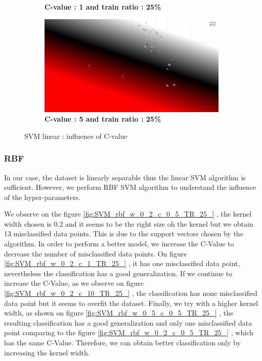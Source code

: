 \begin{figure}[ht]
\begin{subfigure}[h]{0.31\textwidth}
\caption{\bf C-value : 1 and train ratio : 25\%}
\end{subfigure}
\hspace{20mm}
\begin{subfigure}[h]{0.31\textwidth}
\includegraphics[height=0.11\textheight]{./classification/SVM_linear_c_5_TR_25_.png}
\caption{\bf C-value : 5 and train ratio : 25\%}
\label{fig:SVM_linear_C_value_5}
\end{subfigure}
\caption{SVM linear : influence of C-value}
\label{fig:SVM_linear_C_value}
\end{figure}

\subsubsection{RBF}

In our case, the dataset is linearly separable thus the linear SVM algorithm is sufficient. However, we perform RBF SVM algorithm to understand the influence of the hyper-parameters.

We observe on the figure \ref{fig:SVM_rbf_w_0_2_c_0_5_TR_25_} %
, the kernel width chosen is 0.2 and it seems to be the right size oh the kernel but we obtain 13 misclassified data points. This is due to the support vectors chosen by the algorithm. In order to perform a better model, we increase the C-Value to decrease the number of misclassified data points. On figure \ref{fig:SVM_rbf_w_0_2_c_1_TR_25_}
, it has one misclassified data point, nevertheless the classification has a good generalization. If we continue to increase the C-Value, as we observe on figure \ref{fig:SVM_rbf_w_0_2_c_10_TR_25_}
, the classification has none misclassified data point but it seems to overfit the dataset.
Finally, we try with a higher kernel width, as shown on figure \ref{fig:SVM_rbf_w_0_5_c_0_5_TR_25_}
, the resulting classification has a good generalization and only one misclassified data point comparing to the figure \ref{fig:SVM_rbf_w_0_2_c_0_5_TR_25_}
, which has the same C-Value. Therefore, we can obtain better classification only by increasing the kernel width. 

